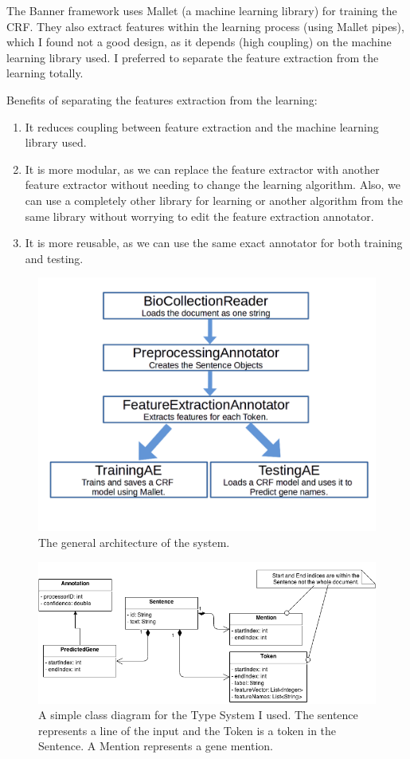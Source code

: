 \documentclass{article}
\begin{document}
The Banner framework uses Mallet (a machine learning library) for training the CRF. They also extract features within the learning process (using Mallet pipes), which I found not a good design, as it depends ({high coupling}) on the machine learning library used. I preferred to separate the feature extraction from the learning totally.

Benefits of separating the features extraction from the learning:
\begin{enumerate}
\item It reduces coupling between feature extraction and the machine learning library used.
\item It is more modular, as we can replace the feature extractor with another feature extractor without needing to change the learning algorithm. Also, we can use a completely other library for learning or another algorithm from the same library without worrying to edit the feature extraction annotator.
\item It is more reusable, as we can use the same exact annotator for both training and testing.
\end{enumerate}
\begin{figure}[h!]
\label{fram} 
\centering
\includegraphics[width=14cm]{framework.png}
  \caption{The general architecture of the system.}
\end{figure}

\begin{figure}[h!]
  \centering
\includegraphics[width=14cm]{HW1-genes-UML.png}

  \caption{A simple class diagram for the Type System I used. The sentence represents a line of the input and the Token is a token in the Sentence. A Mention represents a gene mention.}
\end{figure}
\end{document}
